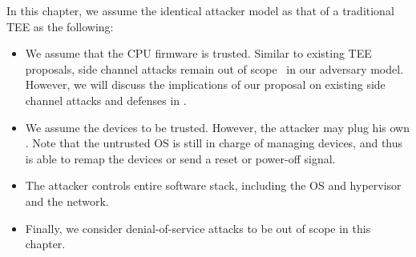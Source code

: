 In this chapter, we assume the identical attacker model as that of a traditional TEE as the following:

\begin{itemize}
  \item We assume that the CPU firmware is trusted. Similar to existing TEE proposals, side channel attacks remain out of scope~\cite{costan2016intel} in our adversary model. However, we will discuss the implications of our proposal on existing side channel attacks and defenses in . 
  
  \item We assume the \sphw devices to be trusted. However, the attacker may plug his own \sphw. Note that the untrusted OS is still in charge of managing \sphw devices, and thus is able to remap the devices or send a reset or power-off signal.
  
  \item  The attacker controls entire software stack, including the OS and hypervisor and the network.
   
  \item Finally, we consider denial-of-service attacks to be out of scope in this chapter. 
\end{itemize}



